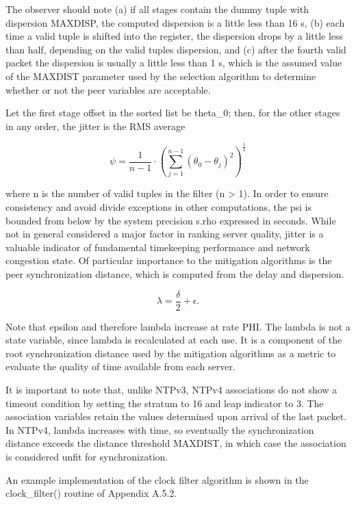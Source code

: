 The observer should note (a) if all stages contain the dummy tuple
with dispersion MAXDISP, the computed dispersion is a little less
than 16 s, (b) each time a valid tuple is shifted into the register,
the dispersion drops by a little less than half, depending on the
valid tuples dispersion, and (c) after the fourth valid packet the
dispersion is usually a little less than 1 s, which is the assumed
value of the MAXDIST parameter used by the selection algorithm to
determine whether or not the peer variables are acceptable.

Let the first stage offset in the sorted list be theta\_0; then, for
the other stages in any order, the jitter is the RMS average

$$
\psi = \frac{1}{n - 1} \cdot \left( \sum^{n - 1}_{j = 1} (\theta_0 - \theta_j)^2 \right)^{\frac{1}{2}}
$$

where n is the number of valid tuples in the filter (n > 1).  In
order to ensure consistency and avoid divide exceptions in other
computations, the psi is bounded from below by the system precision
s.rho expressed in seconds.  While not in general considered a major
factor in ranking server quality, jitter is a valuable indicator of
fundamental timekeeping performance and network congestion state.  Of
particular importance to the mitigation algorithms is the peer
synchronization distance, which is computed from the delay and
dispersion.

$$
\lambda = \frac{\delta}{2} + \epsilon.
$$

Note that epsilon and therefore lambda increase at rate PHI.  The
lambda is not a state variable, since lambda is recalculated at each
use.  It is a component of the root synchronization distance used by
the mitigation algorithms as a metric to evaluate the quality of time
available from each server.

It is important to note that, unlike NTPv3, NTPv4 associations do not
show a timeout condition by setting the stratum to 16 and leap
indicator to 3.  The association variables retain the values
determined upon arrival of the last packet.  In NTPv4, lambda
increases with time, so eventually the synchronization distance
exceeds the distance threshold MAXDIST, in which case the association
is considered unfit for synchronization.

An example implementation of the clock filter algorithm is shown in
the clock\_filter() routine of Appendix A.5.2.
